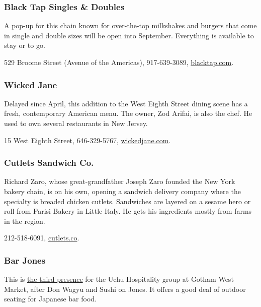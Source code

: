 \hypertarget{black-tap-singles--doubles-}{%
\subsubsection{Black Tap Singles \& Doubles
}\label{black-tap-singles--doubles-}}

A pop-up for this chain known for over-the-top milkshakes and burgers
that come in single and double sizes will be open into September.
Everything is available to stay or to go.

529 Broome Street (Avenue of the Americas), 917-639-3089,
\href{https://blacktap.com/}{blacktap.com}.

\hypertarget{wicked-jane-}{%
\subsubsection{Wicked Jane }\label{wicked-jane-}}

Delayed since April, this addition to the West Eighth Street dining
scene has a fresh, contemporary American menu. The owner, Zod Arifai, is
also the chef. He used to own several restaurants in New Jersey.

15 West Eighth Street, 646-329-5767,
\href{https://www.wickedjane.com/}{wickedjane.com}.

\hypertarget{cutlets-sandwich-co}{%
\subsubsection{Cutlets Sandwich Co.}\label{cutlets-sandwich-co}}

Richard Zaro, whose great-grandfather Joseph Zaro founded the New York
bakery chain, is on his own, opening a sandwich delivery company where
the specialty is breaded chicken cutlets. Sandwiches are layered on a
sesame hero or roll from Parisi Bakery in Little Italy. He gets his
ingredients mostly from farms in the region.

212-518-6091, \href{http://cutlets.co/}{cutlets.co}.

\hypertarget{bar-jones-}{%
\subsubsection{Bar Jones }\label{bar-jones-}}

This is
\href{https://gothamwestmarket.com/vendor/bar-jones-by-sushi-on-jones/}{the
third presence} for the Uchu Hospitality group at Gotham West Market,
after Don Wagyu and Sushi on Jones. It offers a good deal of outdoor
seating for Japanese bar food.

